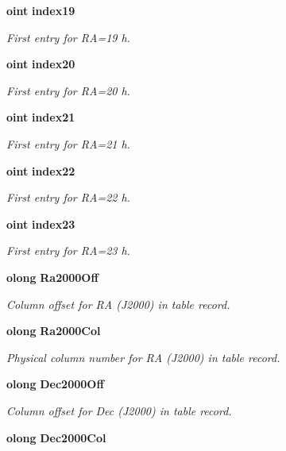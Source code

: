 \begin{CompactItemize}
{\bf oint} {\bf index19}
\begin{CompactList}\small\item\em First entry for RA=19 h. \item\end{CompactList}\item 
{\bf oint} {\bf index20}
\begin{CompactList}\small\item\em First entry for RA=20 h. \item\end{CompactList}\item 
{\bf oint} {\bf index21}
\begin{CompactList}\small\item\em First entry for RA=21 h. \item\end{CompactList}\item 
{\bf oint} {\bf index22}
\begin{CompactList}\small\item\em First entry for RA=22 h. \item\end{CompactList}\item 
{\bf oint} {\bf index23}
\begin{CompactList}\small\item\em First entry for RA=23 h. \item\end{CompactList}\item 
{\bf olong} {\bf Ra2000Off}
\begin{CompactList}\small\item\em Column offset for RA (J2000) in table record. \item\end{CompactList}\item 
{\bf olong} {\bf Ra2000Col}
\begin{CompactList}\small\item\em Physical column number for RA (J2000) in table record. \item\end{CompactList}\item 
{\bf olong} {\bf Dec2000Off}
\begin{CompactList}\small\item\em Column offset for Dec (J2000) in table record. \item\end{CompactList}\item 
{\bf olong} {\bf Dec2000Col}

\end{CompactItemize}
